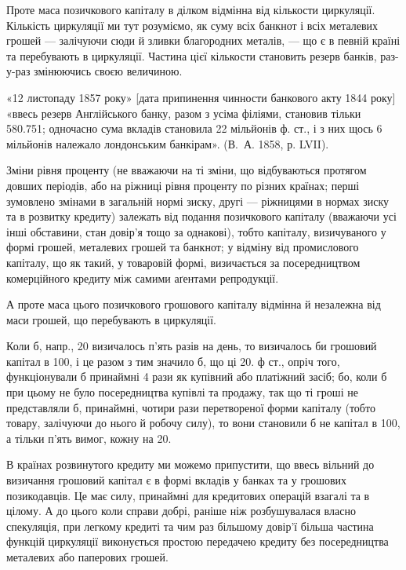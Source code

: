 
Проте маса позичкового капіталу в ділком відмінна від кількости циркуляції.
Кількість циркуляції ми тут розуміємо, як суму всіх банкнот і всіх металевих
грошей — залічуючи сюди й зливки благородних металів, — що є в певній
країні та перебувають в циркуляції. Частина цієї кількости становить резерв
банків, раз-у-раз змінюючись своєю величиною.

«12 листопаду 1857 року» [дата припинення чинности банкового акту
1844 року] «ввесь резерв Англійського банку, разом з усіма філіями, становив
тільки \num{580.751}; одночасно сума вкладів становила 22 мільйонів ф. ст.,
і з них щось 6 мільйонів належало лондонським банкірам». (В.~А. 1858, р. LVII).

Зміни рівня проценту (не вважаючи на ті зміни, що відбуваються протягом
довших періодів, або на ріжниці рівня проценту по різних країнах; перші
зумовлено змінами в загальній нормі зиску, другі — ріжницями в нормах зиску
та в розвитку кредиту) залежать від подання позичкового капіталу (вважаючи
усі інші обставини, стан довір’я тощо за однакові), тобто капіталу, визичуваного
у формі грошей, металевих грошей та банкнот; у відміну від промислового
капіталу, що як такий, у товаровій формі, визичається за посередництвом
комерційного кредиту між самими аґентами репродукції.

А проте маса цього позичкового грошового капіталу відмінна й незалежна
від маси грошей, що перебувають в циркуляції.

Коли б, напр., 20 визичалось п’ять разів на день, то визичалось би
грошовий капітал в 100, і це разом з тим значило б, що ці 20. ф ст.,
опріч того, функціонували б принаймні 4 рази як купівний або платіжний
засіб; бо, коли б при цьому не було посередництва купівлі та продажу, так
що ті гроші не представляли б, принаймні, чотири рази перетвореної форми
капіталу (тобто товару, залічуючи до нього й робочу силу), то вони становили б
не капітал в 100, а тільки п’ять вимог, кожну на 20.

В країнах розвинутого кредиту ми можемо припустити, що ввесь вільний до
визичання грошовий капітал є в формі вкладів у банках та у грошових позикодавців.
Це має силу, принаймні для кредитових операцій взагалі та в цілому. А до цього
коли справи добрі, раніше ніж розбушувалася власно спекуляція, при легкому кредиті
та чим раз більшому довір’ї більша частина функцій циркуляції виконується
простою передачею кредиту без посередництва металевих або паперових грошей.


